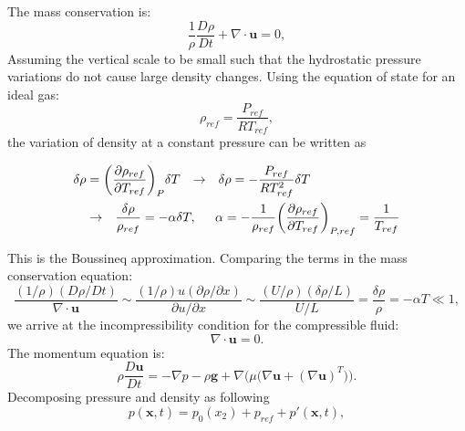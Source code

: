 \documentclass[preprint,12pt]{article}
\begin{document}
The mass conservation is:
\begin{equation}
\frac{1}{\rho}\frac{D\rho}{Dt}+\nabla\cdot \mathbf{u}=0,
\end{equation}
Assuming the vertical scale to be small such that the hydrostatic pressure variations do not cause large density changes. Using the equation of state for an ideal gas:
\begin{equation}
\rho_{ref}=\frac{P_{ref}}{RT_{ref}},
\end{equation}
the variation of density at a constant pressure can be written as
\begin{tcolorbox}
\begin{align}\label{eq:boussineq_1}
\begin{split}
\delta \rho&=\bigg(\frac{\partial \rho_{ref}}{\partial T_{ref}}\bigg)_P\delta T \hspace{0.1in} \rightarrow \hspace{0.1in} \delta \rho=-\frac{P_{ref}}{R T_{ref}^2}\delta T \hspace{0.1in} \\&\rightarrow \hspace{0.1in}  \frac{\delta\rho}{\rho_{ref}}=-\alpha\delta T,\hspace{0.2in} \alpha=-\frac{1}{\rho_{ref}}\bigg(\frac{\partial \rho_{ref}}{\partial T_{ref}}\bigg)_{P,ref}=\frac{1}{T_{ref}}
\end{split}
\end{align}
\end{tcolorbox}
This is the Boussineq approximation. Comparing the terms in the mass conservation equation:
\begin{equation}
\frac{(1/\rho) (D\rho/Dt)}{\nabla\cdot \mathbf{u}}\sim \frac{(1/\rho)u(\partial \rho/\partial x)}{\partial u/\partial x}\sim\frac{(U/\rho)(\delta \rho/L)}{U/L}=\frac{\delta \rho}{\rho}=-\alpha T \ll 1,
\end{equation}
we arrive at the incompressibility condition for the compressible fluid:
\begin{equation}\label{eq:incompressibility}
\nabla\cdot \mathbf{u}=0.
\end{equation}
The momentum equation is:
\begin{equation}\label{eq:momentum_1}
\rho\frac{D\mathbf{u}}{Dt}=-\nabla p-\rho \mathbf{g}+\nabla\Big(\mu\big(\nabla \mathbf{u}+(\nabla \mathbf{u})^T\big)\Big).
\end{equation}
Decomposing pressure and density as following
\begin{equation}
p(\mathbf{x},t)=p_0({x}_2)+p_{ref}+p'(\mathbf{x},t),
\end{equation}
\end{document}
